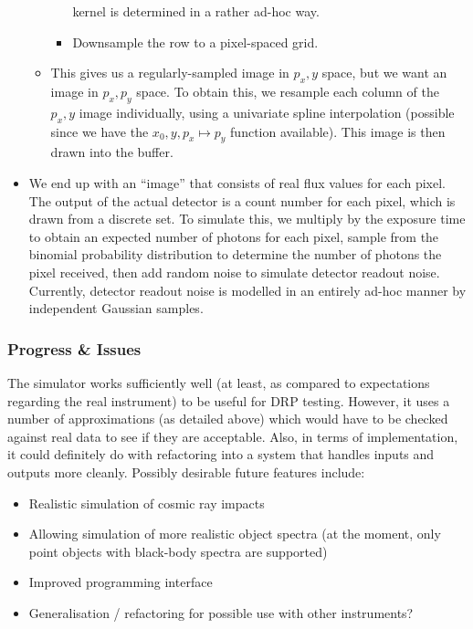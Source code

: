 \begin{itemize}
\begin{itemize}
\begin{itemize}
kernel is determined in a rather ad-hoc way.
%
\item Downsample the row to a pixel-spaced grid.
\end{itemize}
%
\item This gives us a regularly-sampled image in $p_x, y$ space, but we want an image
in $p_x, p_y$ space. To obtain this, we resample each column of the $p_x, y$ image
individually, using a univariate spline interpolation (possible since we have the
$x_0, y, p_x \mapsto p_y$ function available). This image is then drawn into the buffer.
\end{itemize}
%
\item We end up with an ``image'' that consists of real flux values for
each pixel. The output of the actual detector is a count number for each
pixel, which is drawn from a discrete set. To simulate this, we multiply
by the exposure time to obtain an expected number of photons for each
pixel, sample from the binomial probability distribution to determine
the number of photons the pixel received, then add random noise to simulate
detector readout noise. Currently, detector readout noise is modelled in an
entirely ad-hoc manner by independent Gaussian samples.

\end{itemize}
%

\subsubsection{Progress \& Issues}

The simulator works sufficiently well (at least, as compared to
expectations regarding the real instrument) to be useful for DRP
testing. However, it uses a number of approximations (as detailed above)
which would have to be checked against real data to see if they are
acceptable. Also, in terms of implementation, it could definitely do with
refactoring into a system that handles inputs and outputs more cleanly.
Possibly desirable future features include:
\begin{itemize}
\item Realistic simulation of cosmic ray impacts
\item Allowing simulation of more realistic object spectra (at the moment,
only point objects with black-body spectra are supported)
\item Improved programming interface
\item Generalisation / refactoring for possible use with other instruments?
\end{itemize}

